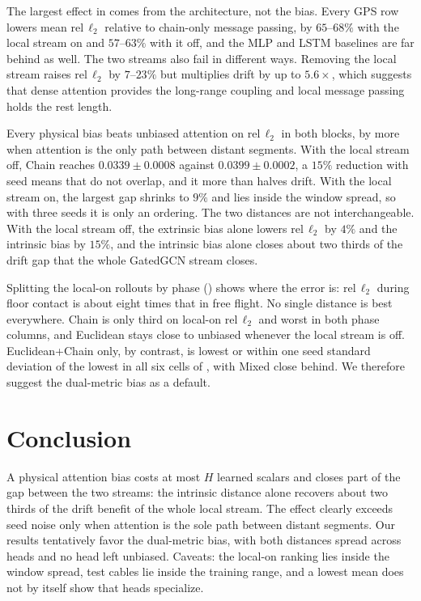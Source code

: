 \documentclass[mlabstract,onecolumn]{jmlr}
\newcommand{\rel}{\mathrm{rel}\,\ell_2}
\begin{document}
The largest effect in  comes from the architecture,
not the bias. Every GPS row lowers mean $\rel$ relative to chain-only message
passing, by $65$--$68\%$ with the local stream on and $57$--$63\%$ with it off,
and the MLP and LSTM baselines are far behind as well. The two streams also
fail in different ways. Removing the local stream raises $\rel$ by $7$--$23\%$
but multiplies drift by up to $5.6\times$, which suggests that dense attention
provides the long-range coupling and local message passing holds the rest
length.

Every physical bias beats unbiased attention on $\rel$ in both blocks, by
more when attention is the only path between distant segments. With the local stream off, Chain reaches
$0.0339\pm0.0008$ against $0.0399\pm0.0002$, a $15\%$ reduction with seed
means that do not overlap, and it more than halves drift. With the local
stream on, the largest gap shrinks to $9\%$ and lies inside the window spread,
so with three seeds it is only an ordering. The two
distances are not interchangeable. With the local stream off, the extrinsic
bias alone lowers $\rel$ by $4\%$ and the intrinsic bias by $15\%$, and the
intrinsic bias alone closes about two thirds of the drift gap that the whole
GatedGCN stream closes.

Splitting the local-on rollouts by phase () shows where
the error is: $\rel$ during floor contact is about eight times that in free
flight. No single distance is best everywhere. Chain is only third on
local-on $\rel$ and worst in both phase columns, and Euclidean stays close to
unbiased whenever the local stream is off. Euclidean+Chain only, by contrast,
is lowest or within one seed standard deviation of the lowest in all six
cells of , with Mixed close behind. We therefore suggest the dual-metric bias as a default.

\section{Conclusion}
\label{sec:conclusion}

A physical attention bias costs at most $H$ learned scalars and closes part
of the gap between the two streams: the intrinsic distance alone recovers
about two thirds of the drift benefit of the whole local stream. The effect
clearly exceeds seed noise only when attention is the sole path between
distant segments. Our results tentatively favor the dual-metric bias, with
both distances spread across heads and no head left unbiased. Caveats: the
local-on ranking lies inside the window spread, test cables lie inside the
training range, and a lowest mean does not by itself show that heads
specialize.
\end{document}
